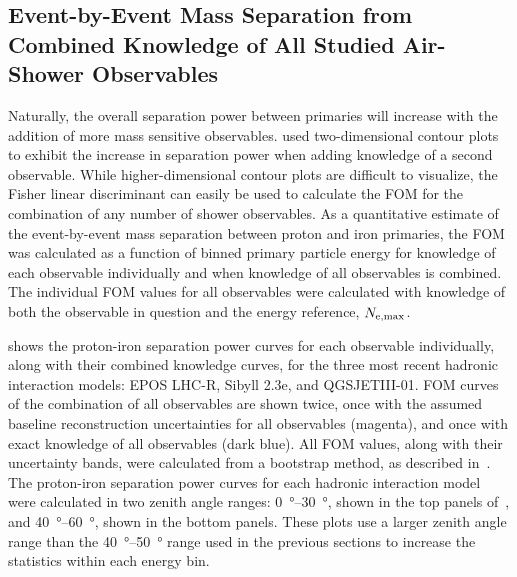 
\subsection{Event-by-Event Mass Separation from Combined Knowledge of All Studied Air-Shower Observables}\label{ssec:combined}
Naturally, the overall separation power between primaries will increase with the addition of more mass sensitive observables.
 used two-dimensional contour plots to exhibit the increase in separation power when adding knowledge of a second observable.
While higher-dimensional contour plots are difficult to visualize, the Fisher linear discriminant can easily be used to calculate the FOM for the combination of any number of shower observables.
As a quantitative estimate of the event-by-event mass separation between proton and iron primaries, the FOM was calculated as a function of binned primary particle energy for knowledge of each observable individually and when knowledge of all observables is combined.
The individual FOM values for all observables were calculated with knowledge of both the observable in question and the energy reference, $N_{\rm{e, max}}$.

 shows the proton-iron separation power curves for each observable individually, along with their combined knowledge curves, for the three most recent hadronic interaction models: EPOS LHC-R, Sibyll 2.3e, and QGSJETIII-01.
FOM curves of the combination of all observables are shown twice, once with the assumed baseline reconstruction uncertainties for all observables (magenta), and once with exact knowledge of all observables (dark blue).
All FOM values, along with their uncertainty bands, were calculated from a bootstrap method, as described in~.
The proton-iron separation power curves for each hadronic interaction model were calculated in two zenith angle ranges: \qtyrange{0}{30}{\degree}, shown in the top panels of~, and \qtyrange{40}{60}{\degree}, shown in the bottom panels.
These plots use a larger zenith angle range than the \qtyrange{40}{50}{\degree} range used in the previous sections to increase the statistics within each energy bin.

